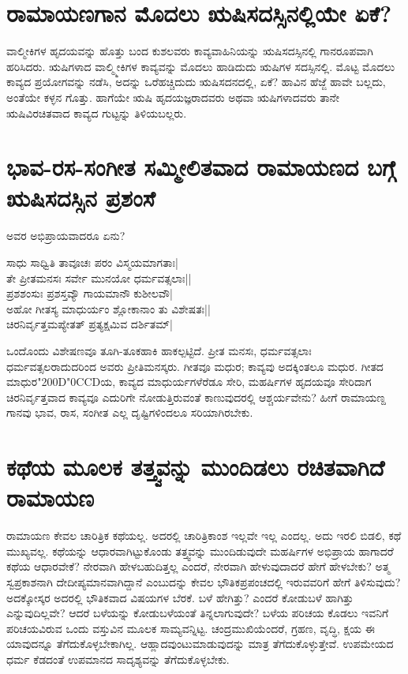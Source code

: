 \section*{ರಾಮಾಯಣಗಾನ ಮೊದಲು ಋಷಿಸದಸ್ಸಿನಲ್ಲಿಯೇ ಏಕೆ?}

ವಾಲ್ಮೀಕಿಗಳ ಹೃದಯವನ್ನು ಹೊತ್ತು ಬಂದ ಕುಶಲವರು ಕಾವ್ಯವಾಹಿನಿಯನ್ನು ಋಷಿಸದಸ್ಸಿನಲ್ಲಿ ಗಾನರೂಪವಾಗಿ ಹರಿಸಿದರು. ಋಷಿಗಳಾದ ವಾಲ್ಮ್ಮೀಕಿಗಳ ಕಾವ್ಯವನ್ನು ಮೊದಲು ಹಾಡಿದುದು ಋಷಿಗಳ ಸದಸ್ಸಿನಲ್ಲಿ. ಮೊಟ್ಟ ಮೊದಲು ಕಾವ್ಯದ ಪ್ರಯೋಗವನ್ನು ನಡೆಸಿ, ಅದನ್ನು ಒರೆಹಚ್ಚಿದುದು ಋಷಿಸದನದಲ್ಲಿ, ಏಕೆ? ಹಾವಿನ ಹೆಜ್ಜೆ ಹಾವೇ ಬಲ್ಲದು, ಅಂತೆಯೇ ಕಳ್ಳನ ಗೊತ್ತು. ಹಾಗೆಯೇ  ಋಷಿ ಹೃದಯಜ್ಞರಾದವರು ಅಥವಾ ಋಷಿಗಳಾದವರು ತಾನೇ ಋಷಿವಿರಚಿತವಾದ ಕಾವ್ಯದ ಗುಟ್ಟನ್ನು ತಿಳಿಯಬಲ್ಲರು. 

\section*{ಭಾವ-ರಸ-ಸಂಗೀತ ಸಮ್ಮೀಲಿತವಾದ ರಾಮಾಯಣದ ಬಗ್ಗೆ ಋಷಿಸದಸ್ಸಿನ ಪ್ರಶಂಸೆ}

ಅವರ ಅಭಿಪ್ರಾಯವಾದರೂ ಏನು?

\begin{shloka}
ಸಾಧು ಸಾಧ್ವಿತಿ ತಾವೂಚಃ ಪರಂ ವಿಸ್ಮಯಮಾಗತಾಃ|\label{242a}\\
ತೇ ಪ್ರೀತಮನಸಃ ಸರ್ವೇ ಮುನಯೋ ಧರ್ಮವತ್ಸಲಾಃ||\\
ಪ್ರಶಶಂಸುಃ ಪ್ರಶಸ್ತವ್ಯೌ ಗಾಯಮಾನೌ ಕುಶೀಲವೌ|\label{243a}\\
ಅಹೋ ಗೀತಸ್ಯ ಮಾಧುರ್ಯಂ ಶ್ಲೋಕಾನಾಂ ತು ವಿಶೇಷತಃ||\\
ಚಿರನಿರ್ವೃತ್ತಮಪ್ಯೇತತ್ ಪ್ರತ್ಯಕ್ಷಮಿವ ದರ್ಶಿತಮ್|\label{243}\\
\end{shloka}

ಒಂದೊಂದು ವಿಶೇಷಣವೂ ತೂಗಿ-ತೂಕಹಾಕಿ ಹಾಕಲ್ಪಟ್ಟಿದೆ. ಪ್ರೀತ ಮನಸಃ, ಧರ್ಮವತ್ಸಲಾಃ ಧರ್ಮವತ್ಸಲರಾದುದರಿಂದ ಅವರು ಪ್ರೀತಿಮನಸ್ಕರು. ಗೀತವೂ ಮಧುರ; ಕಾವ್ಯವು ಅದಕ್ಕಿಂತಲೂ ಮಧುರ. ಗೀತದ ಮಾಧುರ\char"200D\char"0CCDಯ,  ಕಾವ್ಯದ ಮಾಧುರ್ಯಗಳೆರೆಡೂ ಸೇರಿ, ಮಹರ್ಷಿಗಳ ಹೃದಯವೂ ಸೇರಿದಾಗ ಚಿರನಿರ್ವೃತ್ತವಾದ ಕಾವ್ಯವೂ ಎದುರಿಗೇ ನೋಡುತ್ತಿರುವಂತೆ ಕಾಣುವುದರಲ್ಲಿ ಆಶ್ಚರ್ಯವೇನು? ಹೀಗೆ ರಾಮಾಯಣ್ದ ಗಾನವು ಭಾವ, ರಾಸ, ಸಂಗೀತ ಎಲ್ಲ ದೃಷ್ಟಿಗಳಿಂದಲೂ ಸರಿಯಾಗಿರಬೇಕು. 

\section*{ಕಥೆಯ ಮೂಲಕ ತತ್ತ್ವವನ್ನು ಮುಂದಿಡಲು ರಚಿತವಾಗಿದೆ ರಾಮಾಯಣ}

ರಾಮಾಯಣ ಕೇವಲ ಚಾರಿತ್ರಿಕ ಕಥೆಯಲ್ಲ. ಅದರಲ್ಲಿ ಚಾರಿತ್ರಿಕಾಂಶ ಇಲ್ಲವೇ ಇಲ್ಲ ಎಂದಲ್ಲ. ಅದು ಇರಲಿ ಬಿಡಲಿ, ಕಥೆ ಮುಖ್ಯವಲ್ಲ. ಕಥೆಯನ್ನು ಆಧಾರವಾಗಿಟ್ಟುಕೊಂಡು ತತ್ತ್ವವನ್ನು ಮುಂದಿಡುವುದೇ ಮಹರ್ಷಿಗಳ ಅಭಿಪ್ರಾಯ ಹಾಗಾದರೆ ಕಥೆಯ ಆಧಾರವೇಕೆ? ನೇರವಾಗಿ ಹೇಳಬಹುದಿತ್ತಲ್ಲ ಎಂದರೆ, ನೇರವಾಗಿ ಹೇಳುವುದಾದರೆ ಹೇಗೆ ಹೇಳಬೇಕು? ಅತ್ಮ ಸ್ವಪ್ರಕಾಶನಾಗಿ ದೇದೀಪ್ಯಮಾನವಾಗಿದ್ದಾನೆ ಎಂಬುದನ್ನು ಕೇವಲ ಭೌತಿಕಪ್ರಪಂಚದಲ್ಲಿ ಇರುವವರಿಗೆ ಹೇಗೆ ತಿಳಿಸುವುದು? ಅದಕ್ಕೋಸ್ಕರ ಅದರಲ್ಲಿ ಭೌತಿಕವಾದ ವಿಷಯಗಳ ಬೆರಕೆ. ಬಳೆ ಹೇಗಿತ್ತು? ಎಂದರೆ ಕೋಡುಬಳೆ ಹಾಗಿತ್ತು ಎನ್ನುವುದಿಲ್ಲವೇ? ಆದರೆ ಬಳೆಯನ್ನು ಕೋಡುಬಳೆಯಂತೆ ತಿನ್ನಲಾಗುವುದೇ? ಬಳೆಯ ಪರಿಚಯ ಕೊಡಲು ಇವನಿಗೆ ಪರಿಚಯವಿರುವ ಒಂದು ವಸ್ತುವಿನ ಮೂಲಕ ಸಾಮ್ಯವನ್ನಿಟ್ಟ. ಚಂದ್ರಮುಖಿಯೆಂದರೆ, ಗ್ರಹಣ, ವೃದ್ಧಿ, ಕ್ಷಯ ಈ ಯಾವುದನ್ನೂ ತೆಗೆದುಕೊಳ್ಳಬೇಕಾಗಿಲ್ಲ. ಆಹ್ಲಾದವುಂಟುಮಾಡುವುದನ್ನು ಮಾತ್ರ ತೆಗೆದುಕೊಳ್ಳುತ್ತೇವೆ. ಉಪಮೇಯದ ಧರ್ಮ ಕೆಡದಂತೆ ಉಪಮಾನದ ಸಾದೃಶ್ಯವನ್ನು ತೆಗೆದುಕೊಳ್ಳಬೇಕು. 

